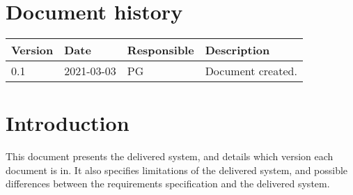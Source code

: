 \documentclass{article}
\date {#1}
\title {
    \documentNumber {01}    
    
    \documentVersion {0.1}
    
    \documentTitle {Template}
    \documentGroup {2}
    
    \documentResponsible {Project Management Group}
    \documentAuthors {Project Management group}
    
    \documentDate {2021-03-03}
}
\begin{document}
\maketitle
\thispagestyle{empty}

\newpage

\tableofcontents

\newpage



\section{Document history}

\begin{tabular}{ l | l | l | l }
    Version & Date & Responsible & Description \\
    \hline
    0.1 & 2021-03-03 & PG & Document created. \\
   
\end{tabular}

\section{Introduction}
    This document presents the delivered system, and details which version each document is in. It also specifies limitations of the delivered system, and possible differences between the requirements specification and the delivered system.
\end{document}

